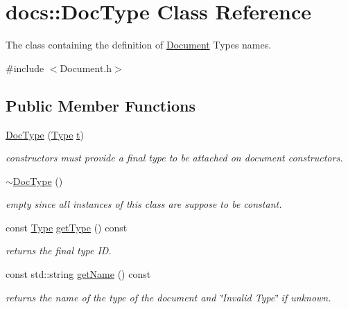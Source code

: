 \hypertarget{classdocs_1_1DocType}{\section{docs\-:\-:Doc\-Type Class Reference}
\label{classdocs_1_1DocType}
}


The class containing the definition of \hyperlink{classdocs_1_1Document}{Document} Types names.  




{\ttfamily \#include $<$Document.\-h$>$}

\subsection*{Public Member Functions}
\begin{DoxyCompactItemize}
\item 
\hypertarget{classdocs_1_1DocType_a0ca0927d1a4d050487d9d14069afc050}{\hyperlink{classdocs_1_1DocType_a0ca0927d1a4d050487d9d14069afc050}{Doc\-Type} (\hyperlink{namespacedocs_a150efca62822b8ab62a5afabe299bf75}{Type} \hyperlink{classdocs_1_1DocType_a58ced824f3508e8f8d73b1ff1bfefc0a}{t})}\label{classdocs_1_1DocType_a0ca0927d1a4d050487d9d14069afc050}

\begin{DoxyCompactList}\small\item\em constructors must provide a final type to be attached on document constructors. \end{DoxyCompactList}\item 
\hypertarget{classdocs_1_1DocType_a931f25a0445c46eb7fba5c515124b728}{\hyperlink{classdocs_1_1DocType_a931f25a0445c46eb7fba5c515124b728}{$\sim$\-Doc\-Type} ()}\label{classdocs_1_1DocType_a931f25a0445c46eb7fba5c515124b728}

\begin{DoxyCompactList}\small\item\em empty since all instances of this class are suppose to be constant. \end{DoxyCompactList}\item 
\hypertarget{classdocs_1_1DocType_a1a7221ca7a1b44b1b115c81c469f6f75}{const \hyperlink{namespacedocs_a150efca62822b8ab62a5afabe299bf75}{Type} \hyperlink{classdocs_1_1DocType_a1a7221ca7a1b44b1b115c81c469f6f75}{get\-Type} () const }\label{classdocs_1_1DocType_a1a7221ca7a1b44b1b115c81c469f6f75}

\begin{DoxyCompactList}\small\item\em returns the final type I\-D. \end{DoxyCompactList}\item 
\hypertarget{classdocs_1_1DocType_a4632fc57ed71ebb984aa8dd78017db03}{const std\-::string \hyperlink{classdocs_1_1DocType_a4632fc57ed71ebb984aa8dd78017db03}{get\-Name} () const }\label{classdocs_1_1DocType_a4632fc57ed71ebb984aa8dd78017db03}

\begin{DoxyCompactList}\small\item\em returns the name of the type of the document and \char`\"{}\-Invalid Type\char`\"{} if unknown. \end{DoxyCompactList}\end{DoxyCompactItemize}
